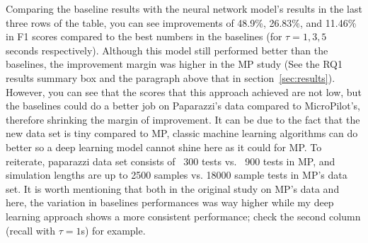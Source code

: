 Comparing the baseline results with the neural network model's results in the last three rows of the table, you can see improvements of 48.9\%, 26.83\%, and 11.46\% in F1 scores compared to the best numbers in the baselines (for $\tau = 1, 3, 5$ seconds respectively). Although this model still performed better than the baselines, the improvement margin was higher in the MP study (See the RQ1 results summary box and the paragraph above that in section~\ref{sec:results}). However, you can see that the scores that this approach achieved are not low, but the baselines could do a better job on Paparazzi's data compared to MicroPilot's, therefore shrinking the margin of improvement. It can be due to the fact that the new data set is tiny compared to MP, classic machine learning algorithms can do better so a deep learning model cannot shine here as it could for MP. To reiterate, paparazzi data set consists of ~300 tests vs. ~900 tests in MP, and simulation lengths are up to 2500 samples vs. 18000 sample tests in MP's data set. It is worth mentioning that both in the original study on MP's data and here, the variation in baselines performances was way higher while my deep learning approach shows a more consistent performance; check the second column (recall with $\tau=1$s) for example. 

